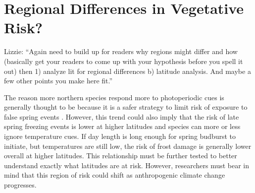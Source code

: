 \documentclass{article}\usepackage[]{graphicx}\usepackage[]{color}
\begin{document}
\section*{Regional Differences in Vegetative Risk?}
Lizzie: ``Again need to build up for readers why regions might differ and how (basically get your readers to come up with your hypothesis before you spell it out) then 1) analyze lit for regional differences b) latitude analysis. And maybe a few other points you make here fit.''

The reason more northern species respond more to photoperiodic cues is generally thought to be because it is a safer strategy to limit risk of exposure to false spring events \citep{Polgar2011}. However, this trend could also imply that the risk of late spring freezing events is lower at higher latitudes and species can more or less ignore temperature cues. If day length is long enough for spring budburst to initiate, but temperatures are still low, the risk of frost damage is generally lower overall at higher latitudes. This relationship must be further tested to better understand exactly what latitudes are at risk. However, researchers must bear in mind that this region of risk could shift as anthropogenic climate change progresses. 


\end{document}
